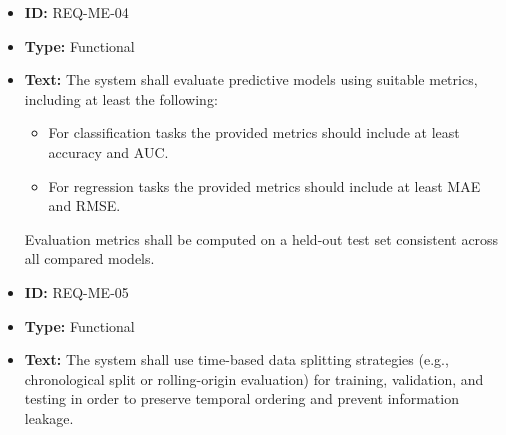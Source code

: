 \documentclass[runningheads]{llncs}
\begin{document}
\begin{itemize}

          \vspace{1em}
    \item \textbf{ID:} REQ-ME-04
    \item \textbf{Type:} Functional
    \item \textbf{Text:} The system shall evaluate predictive models using suitable metrics, including at least the following:
          \begin{itemize}
              \item For classification tasks the provided metrics should include at least accuracy and AUC.
              \item For regression tasks the provided metrics should include at least MAE and RMSE.
          \end{itemize}
          Evaluation metrics shall be computed on a held-out test set consistent across all compared models.

          \vspace{1em}
    \item \textbf{ID:} REQ-ME-05
    \item \textbf{Type:} Functional
    \item \textbf{Text:} The system shall use time-based data splitting strategies (e.g., chronological split or rolling-origin evaluation) for training, validation, and testing in order to preserve temporal ordering and prevent information leakage.


\end{itemize}
\end{document}
